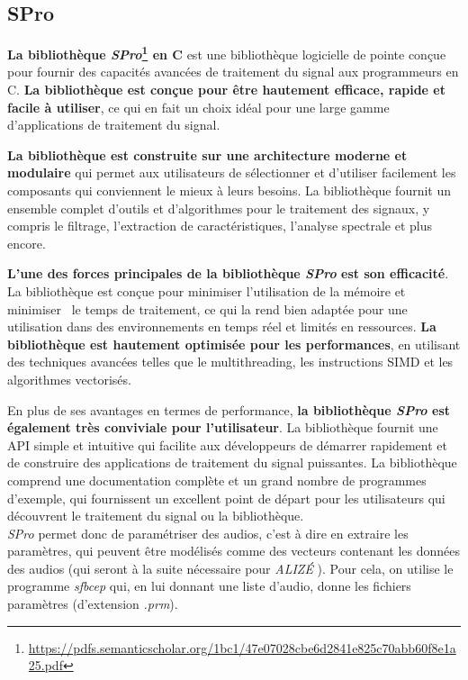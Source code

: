 \subsection{SPro}
\label{subsec:SPro}

\textbf{La bibliothèque \textit{SPro}\footnote{\url{https://pdfs.semanticscholar.org/1bc1/47e07028cbe6d2841e825c70abb60f8e1a25.pdf}} en C} est une bibliothèque logicielle de pointe conçue pour fournir des capacités avancées de traitement du signal
aux programmeurs en C. \textbf{La bibliothèque est conçue pour être hautement efficace, rapide et facile à utiliser}, ce qui en fait un choix idéal
pour une large gamme d'applications de traitement du signal.

\textbf{La bibliothèque est construite sur une architecture moderne et modulaire} qui permet aux utilisateurs de sélectionner et d'utiliser facilement
les composants qui conviennent le mieux à leurs besoins. La bibliothèque fournit un ensemble complet d'outils et d'algorithmes pour le traitement des signaux,
y compris le filtrage, l'extraction de caractéristiques, l'analyse spectrale et plus encore.

\textbf{L'une des forces principales de la bibliothèque \textit{SPro} est son efficacité}. La bibliothèque est conçue pour minimiser l'utilisation de la mémoire et minimiser \
le temps de traitement, ce qui la rend bien adaptée pour une utilisation dans des environnements en temps réel et limités en ressources. \textbf{La bibliothèque est hautement optimisée pour
      les performances}, en utilisant des techniques avancées telles que le multithreading, les instructions SIMD et les algorithmes vectorisés.

En plus de ses avantages en termes de performance, \textbf{la bibliothèque \textit{SPro} est également très conviviale pour l'utilisateur}.
La bibliothèque fournit une API simple et intuitive qui facilite aux développeurs de démarrer rapidement et de construire des applications de
traitement du signal puissantes. La bibliothèque comprend une documentation complète et un grand nombre de programmes d'exemple, qui fournissent
un excellent point de départ pour les utilisateurs qui découvrent le traitement du signal ou la bibliothèque.\\

\textit{ SPro} permet donc de paramétriser des audios, c'est à dire en extraire les paramètres, qui peuvent être modélisés comme des vecteurs contenant les
données des audios (qui seront à la suite nécessaire pour \textit{ALIZÉ} ).
Pour cela, on utilise le programme \textit{sfbcep} qui, en lui donnant une liste d'audio, donne les fichiers paramètres (d'extension \textit{.prm}).

